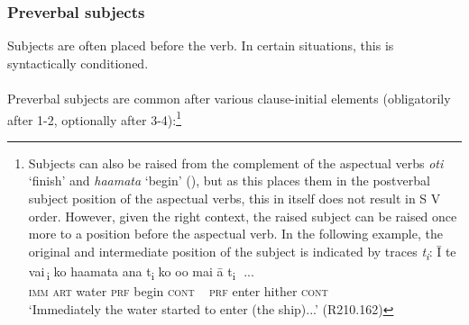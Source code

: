\subsubsection[Preverbal subjects]{Preverbal subjects}\label{sec:8.6.1.1}
Subjects are often placed before the verb. In certain situations, this is syntactically conditioned. 

\paragraph{}\label{sec:8.6.1.1.1} Preverbal subjects are common after various clause-initial elements (obligatorily after 1-2, optionally after 3-4):\footnote{\label{fn:419}Subjects can also be raised from the complement of the aspectual verbs \textit{oti} ‘finish’ and \textit{\mbox{ha{\ꞌ}amata}} ‘begin’ (), but as this places them in the postverbal subject position of the aspectual verbs, this in itself does not result in S V order. However, given the right context, the raised subject can be raised once more to a position before the aspectual verb. In the following example, the original and intermediate position of the subject is indicated by traces \textit{\textup{t}}\textit{\textsubscript{i}}:
\ea \gll
{\ꞌ}Ī {\ob}te vai\,{\cb}\textsubscript{\textup{i}} {\ob}ko ha{\ꞌ}amata {\ꞌ}ana \textup{t\textsubscript{i}} {\ob}ko o{\ꞌ}o mai {\ꞌ}ā \textup{t\textsubscript{i}} \,{\cb}\,{\cb}...\\
  \textsc{imm} {\db}\textsc{art} water {\db}\textsc{prf} begin \textsc{cont} ~ {\db}\textsc{prf} enter hither \textsc{cont}\\
  \glt 
  ‘Immediately the water started to enter (the ship)...’ (R210.162)\z }

